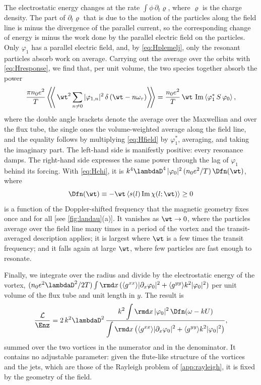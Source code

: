 The electrostatic energy changes at the rate \(\int\phi\,\partial_t\varrho\), where \(\varrho\) is the charge density. The part of \(\partial_t\varrho\) that is due to the motion of the particles along the field line is minus the divergence of the parallel current, so the corresponding change of energy is minus the work done by the parallel electric field on the particles. Only \(\varphi_1\) has a parallel electric field, and, by \cref{eq:Hplemelj}, only the resonant particles absorb work on average. Carrying out the average over the orbits with \cref{eq:Hresponse}, we find that, per unit volume, the two species together absorb the power
\begin{equation}
\frac{\pi n_0e^2}{T}\left\langle\!\!\left\langle\,\wt^2\sum_{n\neq0}|\varphi_{1,n}|^2\,\delta\left(\wt - n\omega_\tau\right)\right\rangle\!\!\right\rangle
= \frac{n_0e^2}{T}\,\wt\,\operatorname{Im}\left\langle\varphi_1^*\,S\,\varphi_0\right\rangle,
\label{eq:Hpower}
\end{equation}
where the double angle brackets denote the average over the Maxwellian and over the flux tube, the single ones the volume-weighted average along the field line, and the equality follows by multiplying \cref{eq:Hfield} by \(\varphi_1^*\), averaging, and taking the imaginary part. The left-hand side is manifestly positive: every resonance damps. The right-hand side expresses the same power through the lag of \(\varphi_1\) behind its forcing. With \cref{eq:Hchi}, it is \(k^4\lambdaD^4\,|\varphi_0|^2\,(n_0e^2/T)\,\Dfn(\wt)\), where
\begin{equation}
\Dfn(\wt) \equiv -\wt\left\langle s(l)\operatorname{Im}\chi(l;\wt)\right\rangle \geq 0
\label{eq:Hdissipation}
\end{equation}
is a function of the Doppler-shifted frequency that the magnetic geometry fixes once and for all [see \cref{fig:landau}(a)]. It vanishes as \(\wt\to0\), where the particles average over the field line many times in a period of the vortex and the transit-averaged description applies; it is largest where \(\wt\) is a few times the transit frequency; and it falls again at large \(\wt\), where few particles are fast enough to resonate.

Finally, we integrate over the radius and divide by the electrostatic energy of the vortex, \((n_0e^2\lambdaD^2/2T)\int\rmd x\,(\langle g^{xx}\rangle|\partial_x\varphi_0|^2 + \langle g^{yy}\rangle k^2|\varphi_0|^2)\) per unit volume of the flux tube and unit length in \(y\). The result is
\begin{equation}
\frac{\mathcal{L}}{\Enz} = 2\,k^2\lambdaD^2\,
\frac{\displaystyle k^2\int\rmd x\,|\varphi_0|^2\,\Dfn\!\left(\omega - kU\right)}
{\displaystyle\int\rmd x\left(\langle g^{xx}\rangle|\partial_x\varphi_0|^2 + \langle g^{yy}\rangle k^2|\varphi_0|^2\right)},
\label{eq:Hrate}
\end{equation}
summed over the two vortices in the numerator and in the denominator. It contains no adjustable parameter: given the flute-like structure of the vortices and the jets, which are those of the Rayleigh problem of \cref{app:rayleigh}, it is fixed by the geometry of the field.


